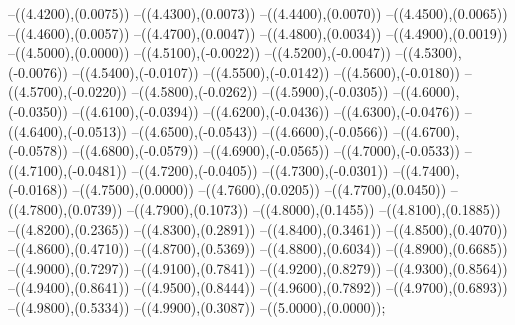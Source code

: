{	--({\sx*(4.4200)},{\sy*(0.0075)})
	--({\sx*(4.4300)},{\sy*(0.0073)})
	--({\sx*(4.4400)},{\sy*(0.0070)})
	--({\sx*(4.4500)},{\sy*(0.0065)})
	--({\sx*(4.4600)},{\sy*(0.0057)})
	--({\sx*(4.4700)},{\sy*(0.0047)})
	--({\sx*(4.4800)},{\sy*(0.0034)})
	--({\sx*(4.4900)},{\sy*(0.0019)})
	--({\sx*(4.5000)},{\sy*(0.0000)})
	--({\sx*(4.5100)},{\sy*(-0.0022)})
	--({\sx*(4.5200)},{\sy*(-0.0047)})
	--({\sx*(4.5300)},{\sy*(-0.0076)})
	--({\sx*(4.5400)},{\sy*(-0.0107)})
	--({\sx*(4.5500)},{\sy*(-0.0142)})
	--({\sx*(4.5600)},{\sy*(-0.0180)})
	--({\sx*(4.5700)},{\sy*(-0.0220)})
	--({\sx*(4.5800)},{\sy*(-0.0262)})
	--({\sx*(4.5900)},{\sy*(-0.0305)})
	--({\sx*(4.6000)},{\sy*(-0.0350)})
	--({\sx*(4.6100)},{\sy*(-0.0394)})
	--({\sx*(4.6200)},{\sy*(-0.0436)})
	--({\sx*(4.6300)},{\sy*(-0.0476)})
	--({\sx*(4.6400)},{\sy*(-0.0513)})
	--({\sx*(4.6500)},{\sy*(-0.0543)})
	--({\sx*(4.6600)},{\sy*(-0.0566)})
	--({\sx*(4.6700)},{\sy*(-0.0578)})
	--({\sx*(4.6800)},{\sy*(-0.0579)})
	--({\sx*(4.6900)},{\sy*(-0.0565)})
	--({\sx*(4.7000)},{\sy*(-0.0533)})
	--({\sx*(4.7100)},{\sy*(-0.0481)})
	--({\sx*(4.7200)},{\sy*(-0.0405)})
	--({\sx*(4.7300)},{\sy*(-0.0301)})
	--({\sx*(4.7400)},{\sy*(-0.0168)})
	--({\sx*(4.7500)},{\sy*(0.0000)})
	--({\sx*(4.7600)},{\sy*(0.0205)})
	--({\sx*(4.7700)},{\sy*(0.0450)})
	--({\sx*(4.7800)},{\sy*(0.0739)})
	--({\sx*(4.7900)},{\sy*(0.1073)})
	--({\sx*(4.8000)},{\sy*(0.1455)})
	--({\sx*(4.8100)},{\sy*(0.1885)})
	--({\sx*(4.8200)},{\sy*(0.2365)})
	--({\sx*(4.8300)},{\sy*(0.2891)})
	--({\sx*(4.8400)},{\sy*(0.3461)})
	--({\sx*(4.8500)},{\sy*(0.4070)})
	--({\sx*(4.8600)},{\sy*(0.4710)})
	--({\sx*(4.8700)},{\sy*(0.5369)})
	--({\sx*(4.8800)},{\sy*(0.6034)})
	--({\sx*(4.8900)},{\sy*(0.6685)})
	--({\sx*(4.9000)},{\sy*(0.7297)})
	--({\sx*(4.9100)},{\sy*(0.7841)})
	--({\sx*(4.9200)},{\sy*(0.8279)})
	--({\sx*(4.9300)},{\sy*(0.8564)})
	--({\sx*(4.9400)},{\sy*(0.8641)})
	--({\sx*(4.9500)},{\sy*(0.8444)})
	--({\sx*(4.9600)},{\sy*(0.7892)})
	--({\sx*(4.9700)},{\sy*(0.6893)})
	--({\sx*(4.9800)},{\sy*(0.5334)})
	--({\sx*(4.9900)},{\sy*(0.3087)})
	--({\sx*(5.0000)},{\sy*(0.0000)});
}
